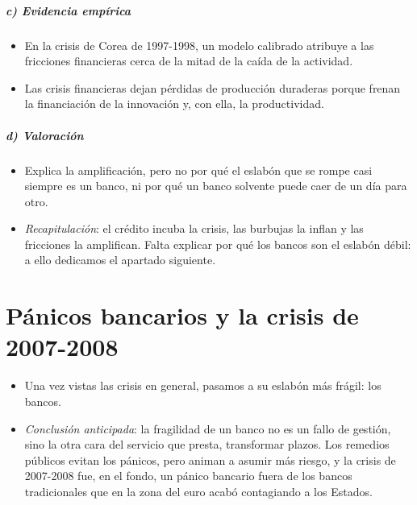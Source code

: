 \documentclass[11pt]{article}
\begin{document}
\subparagraph{c) Evidencia empírica}

\begin{itemize}
\item En la crisis de Corea de 1997-1998, un modelo calibrado atribuye a las fricciones financieras cerca de la mitad de la caída de la actividad\nocite{GertlerGilchristNatalucci2007}.
\item Las crisis financieras dejan pérdidas de producción duraderas porque frenan la financiación de la innovación y, con ella, la productividad\nocite{Queralto2020Slow}.
\end{itemize}

\subparagraph{d) Valoración}

\begin{itemize}
\item Explica la amplificación, pero no por qué el eslabón que se rompe casi siempre es un banco, ni por qué un banco solvente puede caer de un día para otro.
\end{itemize}

\begin{itemize}
\item \emph{Recapitulación}: el crédito incuba la crisis, las burbujas la inflan y las fricciones la amplifican. Falta explicar por qué los bancos son el eslabón débil: a ello dedicamos el apartado siguiente.
\end{itemize}

\section{Pánicos bancarios y la crisis de 2007-2008}\label{sec:panicos}

\begin{itemize}
\item Una vez vistas las crisis en general, pasamos a su eslabón más frágil: los bancos.
\item \emph{Conclusión anticipada}: la fragilidad de un banco no es un fallo de gestión, sino la otra cara del servicio que presta, transformar plazos. Los remedios públicos evitan los pánicos, pero animan a asumir más riesgo, y la crisis de 2007-2008 fue, en el fondo, un pánico bancario fuera de los bancos tradicionales que en la zona del euro acabó contagiando a los Estados.
\end{itemize}

\end{document}
